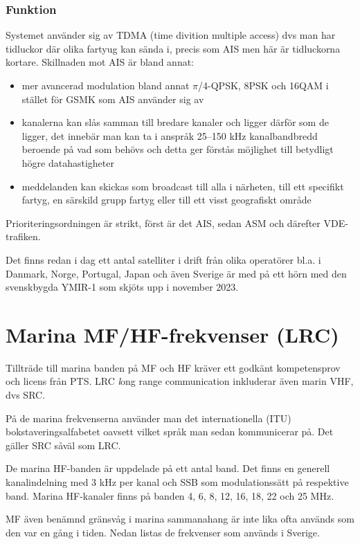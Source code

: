 \subsubsection{Funktion}

Systemet använder sig av TDMA (time divition multiple access) dvs man
har tidluckor där olika fartyug kan sända i, precis som AIS men här är
tidluckorna kortare. Skillnaden mot AIS är bland annat:

\begin{itemize}
  \item mer avancerad modulation bland annat $\pi$/4-QPSK, 8PSK och
    16QAM i stället för GSMK som AIS använder sig av
  \item kanalerna kan slås samman till bredare kanaler och ligger
    därför som de ligger, det innebär man kan ta i anspråk 25--150 kHz
    kanalbandbredd beroende på vad som behövs och detta ger förstås
    möjlighet till betydligt högre datahastigheter
  \item meddelanden kan skickas som broadcast till alla i närheten,
    till ett specifikt fartyg, en särskild grupp fartyg eller till ett
    visst geografiskt område
\end{itemize}

Prioriteringsordningen är strikt, först är det AIS, sedan ASM och
därefter VDE-trafiken.

Det finns redan i dag ett antal satelliter i drift från olika
operatörer bl.a. i Danmark, Norge, Portugal, Japan och även Sverige är
med på ett hörn med den svenskbygda YMIR-1 som skjöts upp i november
2023.

\section{Marina MF/HF-frekvenser (LRC)}

Tillträde till marina banden på MF och HF kräver ett godkänt kompetensprov och
licens från PTS. LRC {\textit long range communication} inkluderar även marin
VHF, dvs SRC.

På de marina frekvenserna använder man det internationella (ITU)
bokstaveringsalfabetet oavsett vilket språk man sedan kommunicerar på. Det
gäller SRC såväl som LRC.

De marina HF-banden är uppdelade på ett antal band. Det finns en
generell kanalindelning med 3 kHz per kanal och SSB som
modulationssätt på respektive band. Marina HF-kanaler finns på banden
4, 6, 8, 12, 16, 18, 22 och 25 MHz.

MF även benämnd gränsvåg i marina sammanahang är inte lika ofta
används som den var en gång i tiden. Nedan listas de frekvenser som
används i Sverige.

